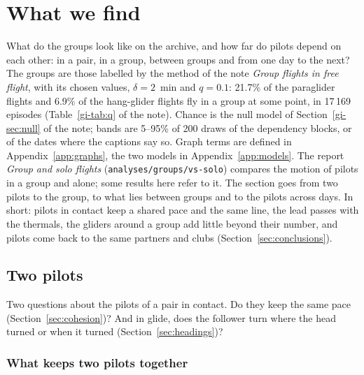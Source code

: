 \section{What we find}\label{sec:structure}

What do the groups look like on the archive, and how far do pilots depend on each other: in a pair,
in a group, between groups and from one day to the next? The groups are those
labelled by the method of the note \emph{Group flights in free flight}, with its chosen values,
$\delta=2$~min and $q=0.1$: 21.7\% of the paraglider flights and 6.9\% of the hang-glider
flights fly in a group at some point, in 17\,169 episodes (Table~\ref{gi-tab:q} of the note).
Chance is the null model of Section~\ref{gi-sec:null} of the note; bands are 5--95\% of 200 draws
of the dependency blocks, or of the dates where the captions say so. Graph terms are defined in
Appendix~\ref{app:graphs}, the two models in Appendix~\ref{app:models}. The report
\emph{Group and solo flights} (\texttt{analyses/groups/vs-solo}) compares the motion
of pilots in a group and alone; some results here refer to it. The section goes from two pilots to
the group, to what lies between groups and to the pilots across days. In short: pilots in contact
keep a shared pace and the same line, the lead passes with the thermals, the gliders around a group
add little beyond their number, and pilots come back to the same partners and clubs
(Section~\ref{sec:conclusions}).


\subsection{Two pilots}\label{sec:pilots}

Two questions about the pilots of a pair in contact. Do they keep the same pace
(Section~\ref{sec:cohesion})? And in glide, does the follower turn where the head turned or when
it turned (Section~\ref{sec:headings})?

\subsubsection{What keeps two pilots together}\label{sec:group-structure}\label{sec:cohesion}

